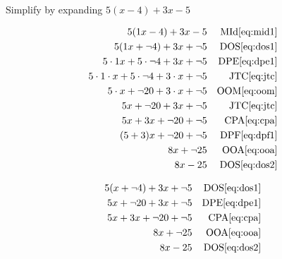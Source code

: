 \documentclass[20150903-160354-rs2.2-MarksMathNotebook.tex]{subfiles}
\begin{document}
\begin{example}[id:20141109-095151] \label{20141109-095151}  \hfill \\

Simplify by expanding $5(x-4)+3x-5$

\soln

\solnsteps
\begin{align*}
5(1x-4)+3x-5 && \text{MId} \eqref{eq:mid1} \\
5(1x + \neg 4)+3x + \neg 5 && \text{DOS} \eqref{eq:dos1} \\
5 \cdot 1x + 5 \cdot \neg 4 + 3x + \neg 5 && \text{DPE} \eqref{eq:dpe1} \\
5 \cdot 1 \cdot x + 5 \cdot \neg 4 + 3 \cdot x + \neg 5 && \text{JTC} \eqref{eq:jtc} \\
5 \cdot x + \neg 20 + 3 \cdot x + \neg 5 && \text{OOM} \eqref{eq:oom} \\
5x + \neg 20 + 3x + \neg 5 && \text{JTC} \eqref{eq:jtc} \\
5x + 3x + \neg 20 + \neg 5 && \text{CPA} \eqref{eq:cpa} \\
(5+3)x + \neg 20 + \neg 5 && \text{DPF} \eqref{eq:dpf1} \\
8x + \neg 25 && \text{OOA} \eqref{eq:ooa} \\
8x-25 && \text{DOS} \eqref{eq:dos2}
\end{align*}

\soln

\lesssteps
\begin{align*}
5(x+ \neg 4)+3x + \neg 5 && \text{DOS} \eqref{eq:dos1} \\
5x + \neg 20 + 3x + \neg 5 && \text{DPE} \eqref{eq:dpe1} \\
5x + 3x + \neg 20 + \neg 5 && \text{CPA} \eqref{eq:cpa} \\
8x + \neg 25 && \text{OOA} \eqref{eq:ooa} \\
8x-25 && \text{DOS} \eqref{eq:dos2}
\end{align*}

\end{example}
\end{document}
